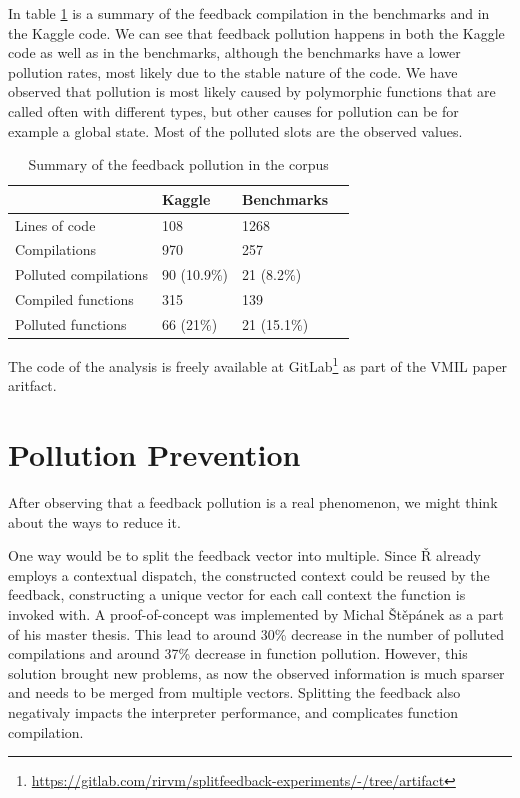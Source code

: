 In table \ref{tbl:pollution-summary} is a summary of the feedback compilation in the benchmarks and in the Kaggle code. We can see that feedback pollution happens in both the Kaggle code as well as in the benchmarks, although the benchmarks have a lower pollution rates, most likely due to the stable nature of the code. We have observed that pollution is most likely caused by polymorphic functions that are called often with different types, but other causes for pollution can be for example a global state. Most of the polluted slots are the observed values.

\begin{table}[H]
	\centering
	\begin{tabular}{llll}
		\hline
		                      & Kaggle      & Benchmarks  \\
		\hline
		Lines of code         & 108         & 1268        \\
		Compilations          & 970         & 257         \\
		Polluted compilations & 90 (10.9\%) & 21 (8.2\%)  \\
		Compiled functions    & 315         & 139         \\
		Polluted functions    & 66 (21\%)   & 21 (15.1\%) \\
		\hline
	\end{tabular}
  \caption{Summary of the feedback pollution in the corpus\cite{feedback-vmil}}\label{tbl:pollution-summary}
\end{table}

The code of the analysis is freely available at GitLab\footnote{\url{https://gitlab.com/rirvm/splitfeedback-experiments/-/tree/artifact}} as part of the VMIL paper\cite{feedback-vmil} aritfact.

\section{Pollution Prevention}

After observing that a feedback pollution is a real phenomenon, we might think about the ways to reduce it.

One way would be to split the feedback vector into multiple. Since Ř already employs a contextual dispatch, the constructed context could be reused by the feedback, constructing a unique vector for each call context the function is invoked with. A proof-of-concept was implemented by Michal Štěpánek as a part of his master thesis\cite{michal2025obohaceny}. This lead to around 30\% decrease in the number of polluted compilations and around 37\% decrease in function pollution. However, this solution brought new problems, as now the observed information is much sparser and needs to be merged from multiple vectors. Splitting the feedback also negativaly impacts the interpreter performance, and complicates function compilation.

